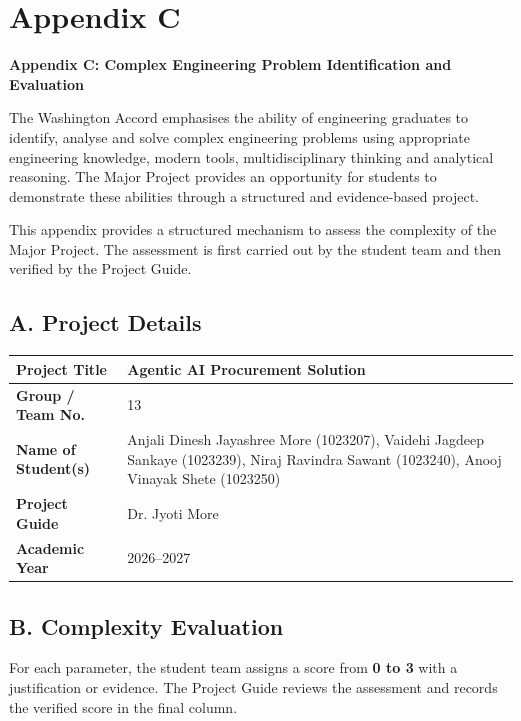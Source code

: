 
\chapter*{Appendix C}

\begin{center}
{\large\bfseries Appendix C: Complex Engineering Problem Identification and Evaluation}
\end{center}

\noindent The Washington Accord emphasises the ability of engineering graduates to identify, analyse and solve complex engineering problems using appropriate engineering knowledge, modern tools, multidisciplinary thinking and analytical reasoning. The Major Project provides an opportunity for students to demonstrate these abilities through a structured and evidence-based project.

\vspace{0.2cm}
\noindent This appendix provides a structured mechanism to assess the complexity of the Major Project. The assessment is first carried out by the student team and then verified by the Project Guide. 

\section*{A. Project Details}
\begin{center}
\renewcommand{\arraystretch}{1.35}
\begin{tabularx}{\textwidth}{|L{4.2cm}|Y|}
\hline
\textbf{Project Title} & Agentic AI Procurement Solution \\ \hline
\textbf{Group / Team No.} & {13} \\ \hline
\textbf{Name of Student(s)} & Anjali Dinesh Jayashree More (1023207), Vaidehi Jagdeep Sankaye (1023239), Niraj Ravindra Sawant (1023240), Anooj Vinayak Shete (1023250) \\ \hline
\textbf{Project Guide} & Dr. Jyoti More \\ \hline
\textbf{Academic Year} & 2026--2027 \\ \hline
\end{tabularx}
\end{center}

\section*{B. Complexity Evaluation}
\noindent For each parameter, the student team assigns a score from \textbf{0 to 3} with a justification or evidence. The Project Guide reviews the assessment and records the verified score in the final column.

